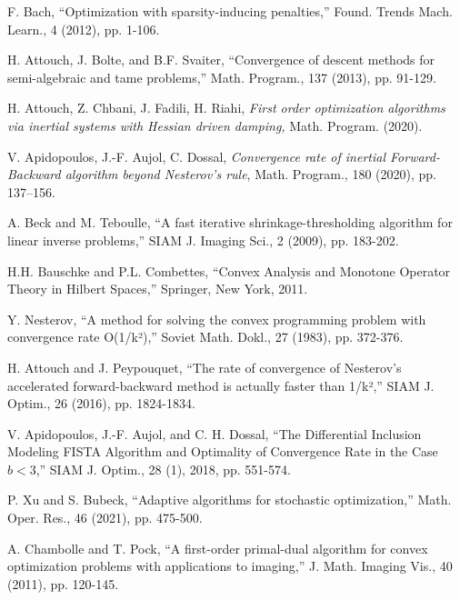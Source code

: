 \documentclass[12pt]{article}
\begin{document}
\begin{thebibliography}{99}
   F. Bach, ``Optimization with sparsity-inducing penalties,'' Found. Trends Mach. Learn., 4 (2012), pp. 1-106.



   H. Attouch, J. Bolte, and B.F. Svaiter, ``Convergence of descent methods for semi-algebraic and tame problems,'' Math. Program., 137 (2013), pp. 91-129.

   H. Attouch, Z. Chbani, J. Fadili, H. Riahi, \textit{First order optimization algorithms via inertial  systems with Hessian driven damping,}  Math. Program. (2020).

   V. Apidopoulos, J.-F. Aujol,  C. Dossal, {\it Convergence rate of inertial Forward-Backward algorithm beyond Nesterov's rule}, Math. Program., 180 (2020), pp. 137--156.

   A. Beck and M. Teboulle, ``A fast iterative shrinkage-thresholding algorithm for linear inverse problems,'' SIAM J. Imaging Sci., 2 (2009), pp. 183-202.

   H.H. Bauschke and P.L. Combettes, ``Convex Analysis and Monotone Operator Theory in Hilbert Spaces,'' Springer, New York, 2011.

   Y. Nesterov, ``A method for solving the convex programming problem with convergence rate O(1/k²),'' Soviet Math. Dokl., 27 (1983), pp. 372-376.

   H. Attouch and J. Peypouquet, ``The rate of convergence of Nesterov's accelerated forward-backward method is actually faster than 1/k²,'' SIAM J. Optim., 26 (2016), pp. 1824-1834.

   V. Apidopoulos, J.-F. Aujol, and C. H. Dossal, ``The Differential Inclusion Modeling FISTA Algorithm and Optimality of Convergence Rate in the Case $b<3$,'' SIAM J. Optim., 28 (1), 2018, pp. 551-574.

   P. Xu and S. Bubeck, ``Adaptive algorithms for stochastic optimization,'' Math. Oper. Res., 46 (2021), pp. 475-500.

   A. Chambolle and T. Pock, ``A first-order primal-dual algorithm for convex optimization problems with applications to imaging,'' J. Math. Imaging Vis., 40 (2011), pp. 120-145.


\end{thebibliography}
\end{document}
